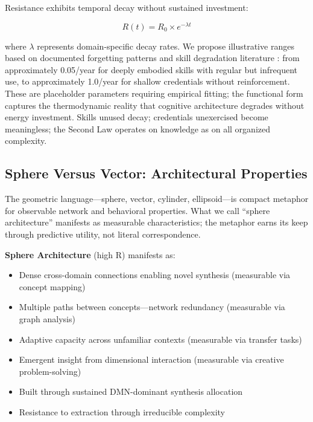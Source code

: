 Resistance exhibits temporal decay without sustained investment:

\begin{equation}
R(t) = R_0 \times e^{-\lambda t}
\label{eq:decay}
\end{equation}

\noindent where $\lambda$ represents domain-specific decay rates. We propose illustrative ranges based on documented forgetting patterns and skill degradation literature \citep{murre2015}: from approximately 0.05/year for deeply embodied skills with regular but infrequent use, to approximately 1.0/year for shallow credentials without reinforcement. These are placeholder parameters requiring empirical fitting; the functional form captures the thermodynamic reality that cognitive architecture degrades without energy investment. Skills unused decay; credentials unexercised become meaningless; the Second Law operates on knowledge as on all organized complexity.

\subsection{Sphere Versus Vector: Architectural Properties}

The geometric language—sphere, vector, cylinder, ellipsoid—is compact metaphor for observable network and behavioral properties. What we call ``sphere architecture'' manifests as measurable characteristics; the metaphor earns its keep through predictive utility, not literal correspondence.

\textbf{Sphere Architecture} (high R) manifests as:
\begin{itemize}
    \item Dense cross-domain connections enabling novel synthesis (measurable via concept mapping)
    \item Multiple paths between concepts—network redundancy (measurable via graph analysis)
    \item Adaptive capacity across unfamiliar contexts (measurable via transfer tasks)
    \item Emergent insight from dimensional interaction (measurable via creative problem-solving)
    \item Built through sustained DMN-dominant synthesis allocation
    \item Resistance to extraction through irreducible complexity
\end{itemize}

